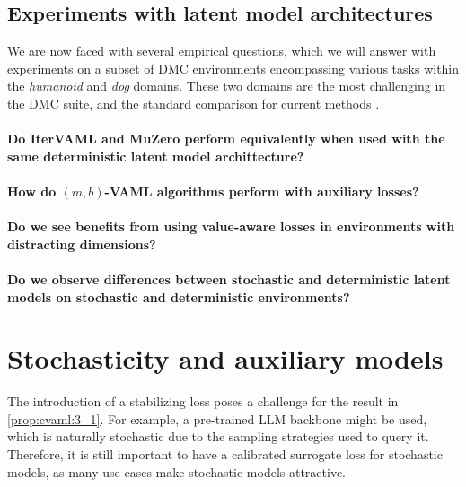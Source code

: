 \subsection{Experiments with latent model architectures}
\label{sec:cvaml:latent_experiments}

We are now faced with several empirical questions, which we will answer with experiments on a subset of DMC environments \cite{tunyasuvunakool2020dmcontrol} encompassing various tasks within the \textit{humanoid} and \textit{dog} domains.
These two domains are the most challenging in the DMC suite, and the standard comparison for current methods \cite{voelcker2025mad,nauman2024bigger}.

\paragraph{Do IterVAML and MuZero perform equivalently when used with the same deterministic latent model archittecture?}

\paragraph{How do $(m,b)$-VAML algorithms perform with auxiliary losses?}

\paragraph{Do we see benefits from using value-aware losses in environments with distracting dimensions?}

\paragraph{Do we observe differences between stochastic and deterministic latent models on stochastic and deterministic environments?}

\section{Stochasticity and auxiliary models}
\label{sec:cvaml:theory_2}

%
The introduction of a stabilizing loss poses a challenge for the result in \autoref{prop:cvaml:3_1}.
For example, a pre-trained LLM backbone might be used, which is naturally stochastic due to the sampling strategies used to query it.
Therefore, it is still important to have a calibrated surrogate loss for stochastic models, as many use cases make stochastic models attractive.

